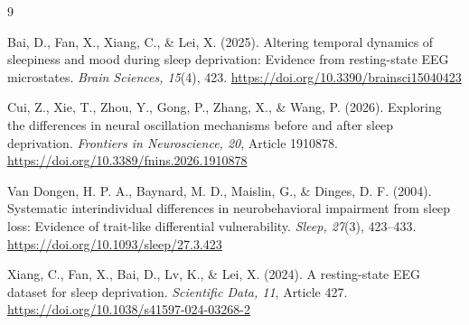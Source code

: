 \documentclass[10pt]{article}
\begin{document}
{\footnotesize
\begin{thebibliography}{9}
\setlength{\itemsep}{1pt}

Bai, D., Fan, X., Xiang, C., \& Lei, X. (2025). Altering temporal dynamics of sleepiness and mood during sleep deprivation: Evidence from resting-state EEG microstates. \emph{Brain Sciences, 15}(4), 423. \url{https://doi.org/10.3390/brainsci15040423}

Cui, Z., Xie, T., Zhou, Y., Gong, P., Zhang, X., \& Wang, P. (2026). Exploring the differences in neural oscillation mechanisms before and after sleep deprivation. \emph{Frontiers in Neuroscience, 20}, Article 1910878. \url{https://doi.org/10.3389/fnins.2026.1910878}

Van Dongen, H. P. A., Baynard, M. D., Maislin, G., \& Dinges, D. F. (2004). Systematic interindividual differences in neurobehavioral impairment from sleep loss: Evidence of trait-like differential vulnerability. \emph{Sleep, 27}(3), 423--433. \url{https://doi.org/10.1093/sleep/27.3.423}

Xiang, C., Fan, X., Bai, D., Lv, K., \& Lei, X. (2024). A resting-state EEG dataset for sleep deprivation. \emph{Scientific Data, 11}, Article 427. \url{https://doi.org/10.1038/s41597-024-03268-2}

\end{thebibliography}
}
\end{document}
